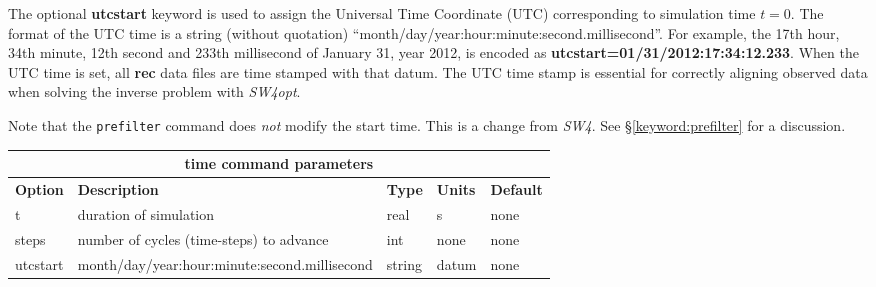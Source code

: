 \documentclass[11pt]{report}
\begin{document}
The optional {\bf utcstart} keyword is used to assign the Universal Time Coordinate (UTC)
corresponding to simulation time $t=0$. The format of the UTC time is a string (without quotation)
``month/day/year:hour:minute:second.millisecond''. For example, the 17th hour, 34th minute, 12th
second and 233th millisecond of January 31, year 2012, is encoded as {\bf
  utcstart=01/31/2012:17:34:12.233}. When the UTC time is set, all {\bf rec} data files are
time stamped with that datum. The UTC time stamp is essential for correctly aligning
observed data when solving the inverse problem with \emph{SW4opt}.

Note that the \verb+prefilter+ command does {\it not} modify the start time. This is a change from
\emph{SW4}. See \S\ref{keyword:prefilter} for a discussion.
%
\begin{center}
\begin{tabular}{|l|p{8cm}|l|l|l|} \hline
\multicolumn{5}{|c|}{\bf time command parameters}\\ \hline
{\bf Option} & {\bf Description} & {\bf Type} & {\bf Units} & {\bf Default} \\ \hline \hline
t & duration of simulation & real & s	& none \\ \hline
steps & number of cycles (time-steps) to advance & int & none & none\\ \hline
utcstart & month/day/year:hour:minute:second.millisecond & string & datum & none\\ \hline
\end{tabular}
\end{center}

\end{document}
